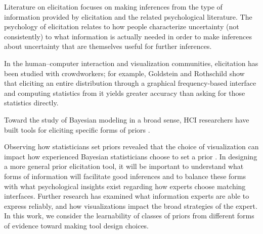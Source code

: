 Literature on elicitation focuses on making inferences from the type of information provided by elicitation and the related psychological literature. The psychology of elicitation relates to how people characterize uncertainty (not consistently) to what information is actually needed in order to make inferences about uncertainty that are themselves useful for further inferences. 

In the human--computer interaction and visualization communities, elicitation has been studied with crowdworkers; for example, Goldstein and Rothschild \cite{GoldsteinRothschild2014} show that eliciting an entire distribution through a graphical frequency-based interface and computing statistics from it yields greater accuracy than asking for those statistics directly.

Toward the study of Bayesian modeling in a broad sense, HCI researchers have built tools for eliciting specific forms of priors \cite{CasementKahle2018,SarmaKay2020}.

Observing how statisticians set priors revealed that the choice of visualization can impact how experienced Bayesian statisticians choose to set a prior \cite{SarmaKay2020}. In designing a more general prior elicitation tool, it will be important to understand what forms of information will facilitate good inferences and to balance these forms with what psychological insights exist regarding how experts choose matching interfaces. Further research has examined what information experts are able to express reliably, and how visualizations impact the broad strategies of the expert. In this work, we consider the learnability of classes of priors from different forms of evidence toward making tool design choices. 



